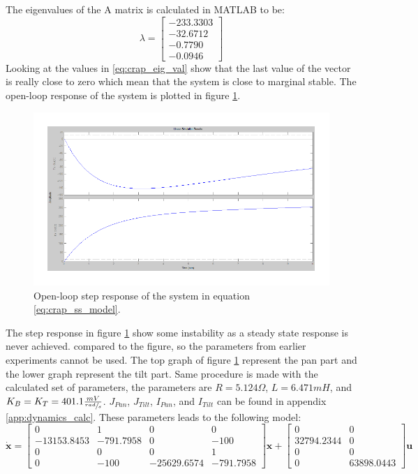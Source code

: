 The eigenvalues of the A matrix is calculated in MATLAB to be:
\begin{equation}
 \lambda =
 \begin{bmatrix}
   - 233.3303\\
   - 32.6712\\
   - 0.7790\\
   - 0.0946
 \end{bmatrix}\label{eq:crap_eig_val}
\end{equation}
Looking at the values in \ref{eq:crap_eig_val} show that the last value of the vector is really close to zero which mean that the system is close to marginal stable. The open-loop response of the system is plotted in figure \ref{fig:crap_step}.
\begin{figure}[htb]
	\centering
	\includegraphics[width=\textwidth,trim=0 0 0 0]{graphics/CrapSim.pdf} %
	\caption{Open-loop step response of the system in equation \ref{eq:crap_ss_model}.}
	\label{fig:crap_step}			%
\end{figure}
The step response in figure \ref{fig:crap_step} show some instability as a steady state response is never achieved.  compared to the figure, so the parameters from earlier experiments cannot be used. The top graph of figure \ref{fig:crap_step} represent the pan part and the lower graph represent the tilt part. Same procedure is made with the calculated set of parameters, the parameters are $R = 5.124\Omega$, $L = 6.471mH$, and $K_B = K_T = 401.1 \frac{mV}{\sfrac{rad}{s}}$. $J_{Pan}$, $J_{Tilt}$, $I_{Pan}$, and $I_{Tilt}$ can be found in appendix \ref{app:dynamics_calc}.
These parameters leads to the following model:
\begin{equation}
 \dot{\textbf{x}} =
 \begin{bmatrix}
   0 & 1 & 0 & 0\\
   - 13153.8453 & - 791.7958 & 0 & - 100\\
   0 & 0 & 0 & 1\\
   0 & - 100 & - 25629.6574 & - 791.7958
 \end{bmatrix}
 \textbf{x} +
 \begin{bmatrix}
   0 & 0\\
   32794.2344 & 0\\
   0 & 0\\
   0 & 63898.0443
 \end{bmatrix}
 \textbf{u}\label{eq:super_ss_model}
\end{equation}
